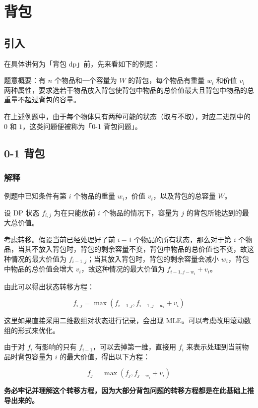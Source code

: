 \section{背包}
\subsection{引入}\label{ux5f15ux5165}

在具体讲何为「背包 dp」前，先来看如下的例题：

题意概要：有 \(n\) 个物品和一个容量为 \(W\) 的背包，每个物品有重量 \(w_{i}\) 和价值 \(v_{i}\) 两种属性，要求选若干物品放入背包使背包中物品的总价值最大且背包中物品的总重量不超过背包的容量。

在上述例题中，由于每个物体只有两种可能的状态（取与不取），对应二进制中的 \(0\) 和 \(1\)，这类问题便被称为「0-1 背包问题」。

\subsection{0-1 背包}\label{ux80ccux5305}

\subsubsection{解释}\label{ux89e3ux91ca}

例题中已知条件有第 \(i\) 个物品的重量 \(w_{i}\)，价值 \(v_{i}\)，以及背包的总容量 \(W\)。

设 DP 状态 \(f_{i,j}\) 为在只能放前 \(i\) 个物品的情况下，容量为 \(j\) 的背包所能达到的最大总价值。

考虑转移。假设当前已经处理好了前 \(i-1\) 个物品的所有状态，那么对于第 \(i\) 个物品，当其不放入背包时，背包的剩余容量不变，背包中物品的总价值也不变，故这种情况的最大价值为 \(f_{i-1,j}\)；当其放入背包时，背包的剩余容量会减小 \(w_{i}\)，背包中物品的总价值会增大 \(v_{i}\)，故这种情况的最大价值为 \(f_{i-1,j-w_{i}}+v_{i}\)。

由此可以得出状态转移方程：

\[
f_{i,j}=\max(f_{i-1,j},f_{i-1,j-w_{i}}+v_{i})
\]

这里如果直接采用二维数组对状态进行记录，会出现 MLE。可以考虑改用滚动数组的形式来优化。

由于对 \(f_i\) 有影响的只有 \(f_{i-1}\)，可以去掉第一维，直接用 \(f_{i}\) 来表示处理到当前物品时背包容量为 \(i\) 的最大价值，得出以下方程：

\[
f_j=\max \left(f_j,f_{j-w_i}+v_i\right)
\]

\textbf{务必牢记并理解这个转移方程，因为大部分背包问题的转移方程都是在此基础上推导出来的。}

